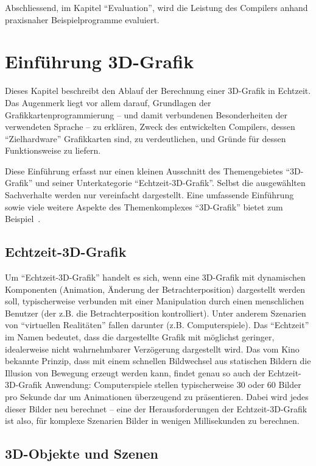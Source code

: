 \documentclass[twoside,a4paper,fleqn,12pt]{book}
\begin{document}
Abschliessend, im Kapitel "`Evaluation"', wird die Leistung des Compilers anhand praxisnaher Beispielprogramme evaluiert.


\chapter{Einführung 3D-Grafik}

Dieses Kapitel beschreibt den Ablauf der Berechnung einer 3D-Grafik in Echtzeit.
Das Augenmerk liegt vor allem darauf, Grundlagen der Grafikkartenprogrammierung -- und damit verbundenen
Besonderheiten der verwendeten Sprache -- zu erklären, Zweck des entwickelten Compilers, dessen "`Zielhardware"' Grafikkarten sind,
zu verdeutlichen, und Gründe für dessen Funktionsweise zu liefern.

Diese Einführung erfasst nur einen kleinen Ausschnitt des Themengebietes "`3D-Grafik"' und seiner Unterkategorie
"`Echtzeit-3D-Grafik"'. Selbst die ausgewählten Sachverhalte werden nur vereinfacht dargestellt.
Eine umfassende Einführung sowie viele weitere Aspekte des Themenkomplexes "`3D-Grafik"' bietet zum Beispiel~\cite{watt_de}.

\section{Echtzeit-3D-Grafik}

Um "`Echtzeit-3D-Grafik"' handelt es sich, wenn eine 3D-Grafik mit dynamischen Komponenten (Animation, Änderung der Betrachterposition)
dargestellt werden soll, typischerweise verbunden mit einer Manipulation durch einen menschlichen Benutzer
(der z.B. die Betrachterposition kontrolliert). Unter anderem Szenarien von "`virtuellen Realitäten"' fallen darunter (z.B. Computerspiele).
Das "`Echtzeit"' im Namen bedeutet, dass die dargestellte Grafik mit möglichst geringer, idealerweise nicht wahrnehmbarer
Verzögerung dargestellt wird. Das vom Kino bekannte Prinzip, dass mit einem schnellen Bildwechsel aus statischen Bildern die Illusion von Bewegung
erzeugt werden kann, findet genau so auch der Echtzeit-3D-Grafik Anwendung: Computerspiele stellen typischerweise 30 oder 60 Bilder
pro Sekunde dar um Animationen überzeugend zu präsentieren. Dabei wird jedes dieser Bilder neu berechnet --
eine der Herausforderungen der Echtzeit-3D-Grafik ist also, für komplexe Szenarien Bilder in wenigen
Millisekunden zu berechnen.

\section{3D-Objekte und Szenen}
\label{objects}
\end{document}
